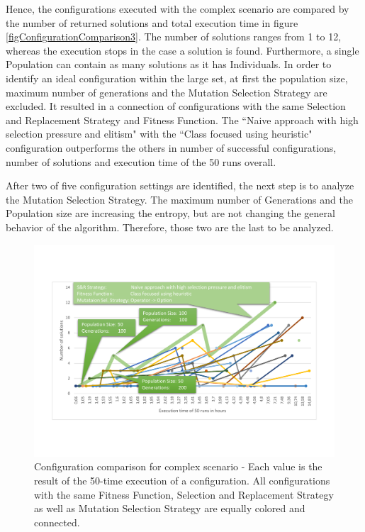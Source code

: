 Hence, the configurations executed with the complex scenario are compared by the number of returned solutions and total execution time in figure \ref{figConfigurationComparison3}. The number of solutions ranges from 1 to 12, whereas the execution stops in the case a solution is found. Furthermore, a single \gls{Population} can contain as many solutions as it has \glspl{Individual}. In order to identify an ideal configuration within the large set, at first the population size, maximum number of generations and the Mutation Selection Strategy are excluded. It resulted in a connection of configurations with the same Selection and Replacement Strategy and Fitness Function. The ``Naive approach with high selection pressure and elitism" with the ``Class focused using heuristic" configuration outperforms the others in number of successful configurations, number of solutions and execution time of the 50 runs overall.

After two of five configuration settings are identified, the next step is to analyze the Mutation Selection Strategy. The maximum number of \glspl{Generation} and the \gls{Population} size are increasing the entropy, but are not changing the general behavior of the algorithm. Therefore, those two are the last to be analyzed.

\begin{figure}[!ht]
	\centering
	\includegraphics[scale=0.55, trim=1.5cm 3.5cm 1.5cm 3.5cm, clip=true]{Images/ConfigurationComparison2.pdf} 
	\caption{Configuration comparison for complex scenario - Each value is the result of the 50-time execution of a configuration. All configurations with the same Fitness Function, Selection and Replacement Strategy as well as Mutation Selection Strategy are equally colored and connected.} %
	\label{figConfigurationComparison2}
\end{figure}

